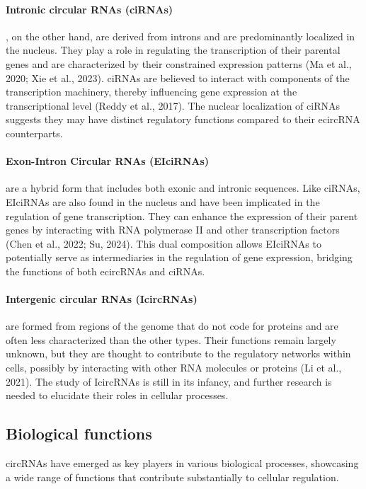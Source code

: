 \paragraph{Intronic circular RNAs (ciRNAs)}, on the other hand, are derived
from introns
and are predominantly localized in the nucleus.
They play a role in regulating the transcription of their parental genes and
are characterized by their constrained expression patterns (Ma et al., 2020;
Xie et al., 2023).
ciRNAs are
believed to interact with components of the transcription machinery, thereby
influencing gene expression at the transcriptional level (Reddy et al., 2017).
The nuclear localization of ciRNAs suggests they may have distinct regulatory
functions compared to their ecircRNA counterparts.

\paragraph{Exon-Intron Circular RNAs (EIciRNAs)} are a hybrid form that
includes both
exonic and intronic sequences.
Like ciRNAs, EIciRNAs are also found in the nucleus and have been implicated in
the regulation of gene transcription.
They can enhance the expression of their parent genes by interacting with RNA
polymerase II and other transcription factors (Chen et al., 2022; Su, 2024).
This dual composition allows EIciRNAs to potentially serve as intermediaries in
the regulation of gene expression, bridging the functions of both ecircRNAs and
ciRNAs.

\paragraph{Intergenic circular RNAs (IcircRNAs)} are formed from regions of the
genome
that do not code for proteins and are often less characterized than the other
types.
Their functions remain largely unknown, but they are thought to contribute to
the regulatory networks within cells, possibly by interacting with other RNA
molecules or proteins (Li et al., 2021).
The study of IcircRNAs is still in its infancy, and further research is needed
to elucidate their roles in cellular processes.

\subsection{Biological functions}
circRNAs have emerged as key players in various biological processes,
showcasing
a wide range of functions that contribute substantially to cellular regulation.

